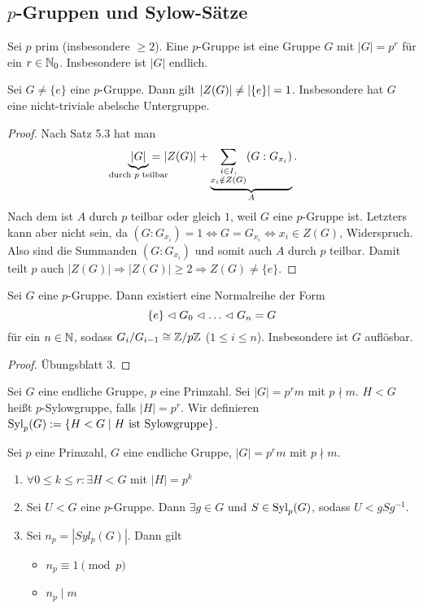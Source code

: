\documentclass[12pt,a4paper]{scrartcl}
\begin{document}
\subsection{$p$-Gruppen und Sylow-Sätze}
\begin{defi}
	Sei $p$ prim (insbesondere $\geq 2$). Eine $p$-Gruppe ist eine Gruppe $G$ mit $|G| = p^r$ für ein $r\in\IN_0$. Insbesondere ist $|G|$ endlich.
\end{defi}
\begin{satz}
	Sei $G\neq\{e\}$ eine $p$-Gruppe. Dann gilt $\abs{Z(G)}\neq \abs*{\{e\}} = 1$. Insbesondere hat $G$ eine nicht-triviale abelsche Untergruppe.
\end{satz}
\begin{proof}
	Nach Satz 5.3 hat man \[ \underbrace{|G|}_{\mathclap{\text{durch $p$ teilbar}}}  = |Z(G)| + \underbrace{\sum_{\substack{i\in I,\\x_i\notin Z(G)}}(G: G_{x_i})}_{A}.\] Nach dem  ist $A$ durch $p$ teilbar oder gleich $1$, weil $G$ eine $p$-Gruppe ist. Letzters kann aber nicht sein, da $(G:G_{x_i}) = 1 \Leftrightarrow G = G_{x_i}\Leftrightarrow x_i\in Z(G)$, Widerspruch. Also sind die Summanden $(G:G_{x_i})$ und somit auch $A$ durch $p$ teilbar. Damit teilt $p$ auch $|Z(G)|\Rightarrow |Z(G)|\geq 2\Rightarrow Z(G)\neq \{e\}$.
\end{proof}

\begin{satz}
	Sei $G$ eine $p$-Gruppe. Dann existiert eine Normalreihe der Form
	$$ \{e\}\nt G_0\nt\dots\nt G_n = G$$ für ein $n\in\IN$, sodass $G_i/G_{i-1}\cong \IZ/p\IZ$ ($1\le i\le n$).
	Insbesondere ist $G$ auflösbar.
\end{satz}
\begin{proof}
	Übungsblatt 3.
\end{proof}

\begin{defi}
	Sei $G$ eine endliche Gruppe, $p$ eine Primzahl. Sei $|G| = p^rm$ mit $p\nmid m$. $H<G$ heißt $p$-Sylowgruppe, falls $|H| = p^r$. Wir definieren  $\Syl_p(G):=\{H<G\mid H\text{ ist Sylowgruppe}\}$.
\end{defi}

\begin{satz}[Sylowsätze] \label{thm:sylow}
	Sei $p$ eine Primzahl, $G$ eine endliche Gruppe, $|G| = p^rm$ mit $p\nmid m$.\begin{enumerate}
		\item $\forall 0\le k\le r \colon\exists H<G$ mit $|H| = p^k$
		\item Sei $U<G$ eine $p$-Gruppe. Dann $\exists g\in G$ und $S\in \Syl_p(G)$, sodass $U<gSg^{-1}$.
		\item Sei $n_p = |Syl_p(G)|$. Dann gilt \begin{itemize}
			\item $n_p\equiv 1\pmod p$
			\item $n_p\mid m$
		\end{itemize}
	\end{enumerate}
\end{satz}
\end{document}
